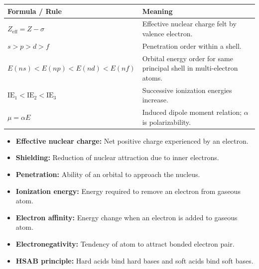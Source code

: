 \documentclass[12pt,a4paper]{article}
\begin{document}
\begin{tcolorbox}[formulabox, title={Key Formulas at a Glance}]
\begin{tabularx}{\linewidth}{|B{4.0cm}|Y|}
\hline
\textbf{Formula / Rule} & \textbf{Meaning} \\
\hline
$Z_{\mathrm{eff}}=Z-\sigma$ & Effective nuclear charge felt by valence electron. \\
\hline
$s>p>d>f$ & Penetration order within a shell. \\
\hline
$E(ns)<E(np)<E(nd)<E(nf)$ & Orbital energy order for same principal shell in multi-electron atoms. \\
\hline
$\mathrm{IE_1}<\mathrm{IE_2}<\mathrm{IE_3}$ & Successive ionization energies increase. \\
\hline
$\mu=\alpha E$ & Induced dipole moment relation; $\alpha$ is polarizability. \\
\hline
\end{tabularx}
\end{tcolorbox}

\begin{tcolorbox}[defbox, title={One-Line Definitions}]
\begin{itemize}[leftmargin=*, itemsep=2pt, topsep=2pt]
  \item \textbf{Effective nuclear charge:} Net positive charge experienced by an electron.
  \item \textbf{Shielding:} Reduction of nuclear attraction due to inner electrons.
  \item \textbf{Penetration:} Ability of an orbital to approach the nucleus.
  \item \textbf{Ionization energy:} Energy required to remove an electron from gaseous atom.
  \item \textbf{Electron affinity:} Energy change when an electron is added to gaseous atom.
  \item \textbf{Electronegativity:} Tendency of atom to attract bonded electron pair.
  \item \textbf{HSAB principle:} Hard acids bind hard bases and soft acids bind soft bases.
\end{itemize}
\end{tcolorbox}
\end{document}
